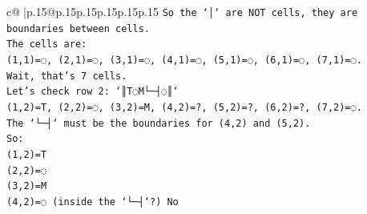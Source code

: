 \documentclass{article}
\begin{document}
{\begin{supertabular}{c@{$\;$}|p{.15\linewidth}@{}p{.15\linewidth}p{.15\linewidth}p{.15\linewidth}p{.15\linewidth}p{.15\linewidth}}
{{{\texttt{So the `│` are NOT cells, they are boundaries between cells.} \\
\texttt{The cells are:} \\
\texttt{(1,1)=◌, (2,1)=◌, (3,1)=◌, (4,1)=◌, (5,1)=◌, (6,1)=◌, (7,1)=◌.} \\
\texttt{Wait, that's 7 cells.} \\
\texttt{Let's check row 2: `║T◌M└─┤◌║`} \\
\texttt{(1,2)=T, (2,2)=◌, (3,2)=M, (4,2)=?, (5,2)=?, (6,2)=?, (7,2)=◌.} \\
\texttt{The `└─┤` must be the boundaries for (4,2) and (5,2).} \\
\texttt{So:} \\
\texttt{(1,2)=T} \\
\texttt{(2,2)=◌} \\
\texttt{(3,2)=M} \\
\texttt{(4,2)=◌ (inside the `└─┤`?) No} \\
            }
        }
    }
     \\ \\


\end{supertabular}}
\end{document}
